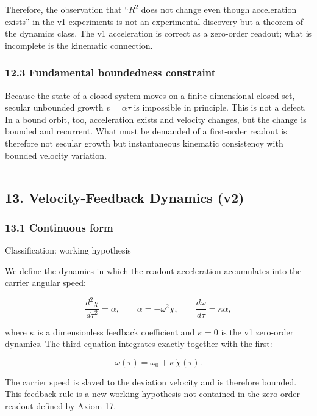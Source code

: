 \documentclass[
  a4paper,
]{article}
\begin{document}
Therefore, the observation that ``\(R^2\) does not change even though
acceleration exists'' in the v1 experiments is not an experimental
discovery but a theorem of the dynamics class. The v1 acceleration is
correct as a zero-order readout; what is incomplete is the kinematic
connection.

\subsubsection{12.3 Fundamental boundedness
constraint}\label{fundamental-boundedness-constraint}

Because the state of a closed system moves on a finite-dimensional
closed set, secular unbounded growth \(v=\alpha\tau\) is impossible in
principle. This is not a defect. In a bound orbit, too, acceleration
exists and velocity changes, but the change is bounded and recurrent.
What must be demanded of a first-order readout is therefore not secular
growth but instantaneous kinematic consistency with bounded velocity
variation.

\begin{center}\rule{0.5\linewidth}{0.5pt}\end{center}

\subsection{13. Velocity-Feedback Dynamics
(v2)}\label{velocity-feedback-dynamics-v2}

\subsubsection{13.1 Continuous form}\label{continuous-form}

Classification: working hypothesis

We define the dynamics in which the readout acceleration accumulates
into the carrier angular speed:

\[
\frac{d^2\chi}{d\tau^2}=\alpha,
\qquad
\alpha=-\omega^2\chi,
\qquad
\frac{d\omega}{d\tau}=\kappa\alpha,
\]

where \(\kappa\) is a dimensionless feedback coefficient and
\(\kappa=0\) is the v1 zero-order dynamics. The third equation
integrates exactly together with the first:

\[
\boxed{
\omega(\tau)=\omega_0+\kappa\,\dot\chi(\tau).
}
\]

The carrier speed is slaved to the deviation velocity and is therefore
bounded. This feedback rule is a new working hypothesis not contained in
the zero-order readout defined by Axiom 17.
\end{document}
